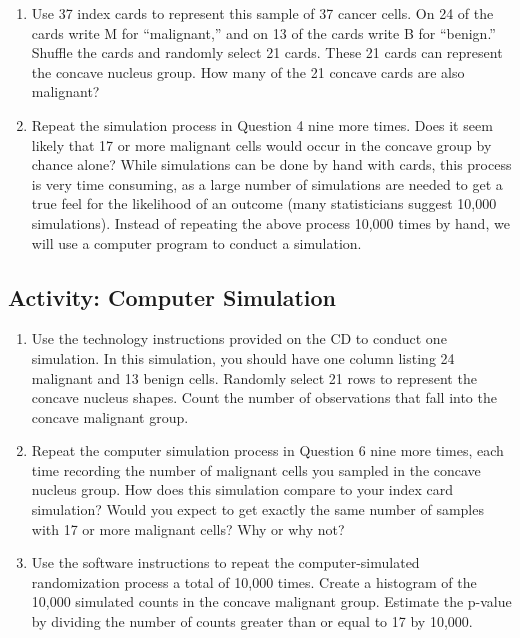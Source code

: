 \documentclass[
]{book}
\begin{document}
\begin{enumerate}
\def\labelenumi{\arabic{enumi}.}
\setcounter{enumi}{3}
\item
  Use 37 index cards to represent this sample of 37 cancer cells. On 24 of the cards write M for ``malignant,'' and on 13 of the cards write B for ``benign.'' Shuffle the cards and randomly select 21 cards. These
  21 cards can represent the concave nucleus group. How many of the 21 concave cards are also malignant?
\item
  Repeat the simulation process in Question 4 nine more times. Does it seem likely that 17 or more malignant cells would occur in the concave group by chance alone? While simulations can be done by hand with cards, this process is very time consuming, as a large number of simulations are needed to get a true feel for the likelihood of an outcome (many statisticians suggest 10,000 simulations). Instead of repeating the above process 10,000 times by hand, we will use a computer program to conduct a simulation.
\end{enumerate}

\hypertarget{activity-computer-simulation}{%
\subsection*{Activity: Computer Simulation}\label{activity-computer-simulation}}

\begin{enumerate}
\def\labelenumi{\arabic{enumi}.}
\setcounter{enumi}{5}
\item
  Use the technology instructions provided on the CD to conduct one simulation. In this simulation, you should have one column listing 24 malignant and 13 benign cells. Randomly select 21 rows to represent
  the concave nucleus shapes. Count the number of observations that fall into the concave malignant group.
\item
  Repeat the computer simulation process in Question 6 nine more times, each time recording the number of malignant cells you sampled in the concave nucleus group. How does this simulation compare to
  your index card simulation? Would you expect to get exactly the same number of samples with 17 or more malignant cells? Why or why not?
\item
  Use the software instructions to repeat the computer-simulated randomization process a total of 10,000 times. Create a histogram of the 10,000 simulated counts in the concave malignant group. Estimate the
  p-value by dividing the number of counts greater than or equal to 17 by 10,000.
\end{enumerate}
\end{document}
